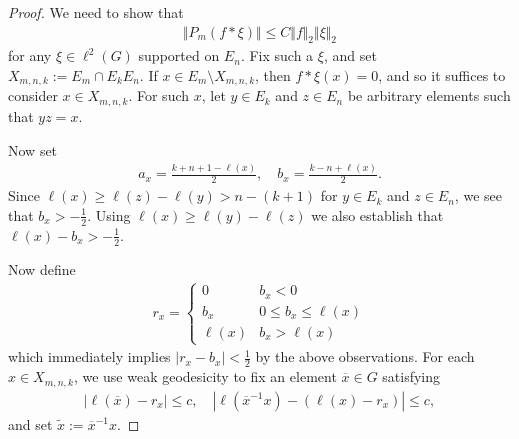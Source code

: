 \documentclass[10pt,a4paper]{amsart}
\begin{document}
\begin{proof}
    We need to show that
    \begin{align*}
        \Vert P_m(f * \xi) \Vert \leq C \Vert f\Vert_2 \Vert \xi \Vert_2
    \end{align*}
    for any $\xi \in \ell^2(G)$  supported on $E_n$. Fix such a $\xi$, and set $X_{m,n,k} := E_m \cap E_kE_n$. If $x \in E_m \setminus X_{m,n,k}$, then $f*\xi(x) = 0$, and so it suffices to consider $x \in X_{m,n,k}$. For such $x$, let $y \in E_k$ and $z \in E_n$ be arbitrary elements such that $yz = x$. 

    Now set
    \begin{align*}
        a_x = \frac{k+n+1 - \ell(x)}{2} , \quad b_x = \frac{k-n +\ell(x)}{2} .
    \end{align*}
     Since $\ell(x) \geq \ell(z) - \ell(y) > n - (k+1)$ for $y \in E_k$ and $z \in E_n$, we see that $b_x > -\frac{1}{2}$. 
    Using $\ell(x) \geq \ell(y) - \ell(z)$ we also establish that $\ell(x) - b_x > -\frac{1}{2}$. 
    
    Now define
    \begin{align*}
        r_x = \begin{cases}
            0 & b_x < 0 \\
            b_x & 0\leq b_x \leq \ell(x) \\
            \ell(x) & b_x > \ell(x)
        \end{cases}
    \end{align*}
    which immediately implies $|r_x - b_x| < \frac{1}{2}$ by the above observations. 
    For each $x \in X_{m,n,k}$, we use weak geodesicity to fix an element $\overline{x} \in G$ satisfying 
    \begin{align*}
        |\ell(\overline{x}) - r_x | \leq c, \quad | \ell(\overline{x}^{-1}x) - (\ell(x) - r_x)| \leq c,
    \end{align*}
    and set $\tilde{x} := \overline{x}^{-1}x$.


\end{proof}
\end{document}
